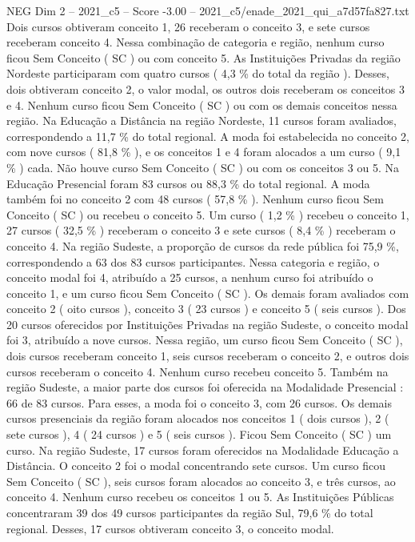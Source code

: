 \begin{textsample}{NEG Dim 2 – 2021\_c5 – Score -3.00 – 2021\_c5/enade\_2021\_qui\_a7d57fa827.txt}
Dois cursos obtiveram conceito 1, 26 receberam o conceito 3, e sete cursos receberam conceito 4.
Nessa combinação de categoria e região, nenhum curso ficou Sem Conceito ( SC ) ou com conceito 5.
As Instituições Privadas da região Nordeste participaram com quatro cursos ( 4,3 \% do total da região ).
Desses, dois obtiveram conceito 2, o valor modal, os outros dois receberam os conceitos 3 e 4.
Nenhum curso ficou Sem Conceito ( SC ) ou com os demais conceitos nessa região.
Na Educação a Distância na região Nordeste, 11 cursos foram avaliados, correspondendo a 11,7 \% do total regional.
A moda foi estabelecida no conceito 2, com nove cursos ( 81,8 \% ), e os conceitos 1 e 4 foram alocados a um curso ( 9,1 \% ) cada.
Não houve curso Sem Conceito ( SC ) ou com os conceitos 3 ou 5.
Na Educação Presencial foram 83 cursos ou 88,3 \% do total regional.
A moda também foi no conceito 2 com 48 cursos ( 57,8 \% ).
Nenhum curso ficou Sem Conceito ( SC ) ou recebeu o conceito 5.
Um curso ( 1,2 \% ) recebeu o conceito 1, 27 cursos ( 32,5 \% ) receberam o conceito 3 e sete cursos ( 8,4 \% ) receberam o conceito 4.
Na região Sudeste, a proporção de cursos da rede pública foi 75,9 \%, correspondendo a 63 dos 83 cursos participantes.
Nessa categoria e região, o conceito modal foi 4, atribuído a 25 cursos, a nenhum curso foi atribuído o conceito 1, e um curso ficou Sem Conceito ( SC ).
Os demais foram avaliados com conceito 2 ( oito cursos ), conceito 3 ( 23 cursos ) e conceito 5 ( seis cursos ).
Dos 20 cursos oferecidos por Instituições Privadas na região Sudeste, o conceito modal foi 3, atribuído a nove cursos.
Nessa região, um curso ficou Sem Conceito ( SC ), dois cursos receberam conceito 1, seis cursos receberam o conceito 2, e outros dois cursos receberam o conceito 4.
Nenhum curso recebeu conceito 5.
Também na região Sudeste, a maior parte dos cursos foi oferecida na Modalidade Presencial : 66 de 83 cursos.
Para esses, a moda foi o conceito 3, com 26 cursos.
Os demais cursos presenciais da região foram alocados nos conceitos 1 ( dois cursos ), 2 ( sete cursos ), 4 ( 24 cursos ) e 5 ( seis cursos ).
Ficou Sem Conceito ( SC ) um curso.
Na região Sudeste, 17 cursos foram oferecidos na Modalidade Educação a Distância.
O conceito 2 foi o modal concentrando sete cursos.
Um curso ficou Sem Conceito ( SC ), seis cursos foram alocados ao conceito 3, e três cursos, ao conceito 4.
Nenhum curso recebeu os conceitos 1 ou 5.
As Instituições Públicas concentraram 39 dos 49 cursos participantes da região Sul, 79,6 \% do total regional.
Desses, 17 cursos obtiveram conceito 3, o conceito modal.

\end{textsample}
